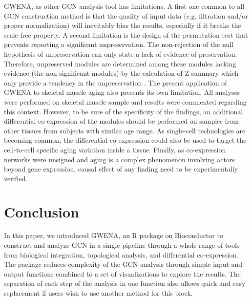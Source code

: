 GWENA, as other GCN analysis tool has limitations. A first one common to all GCN construction method is that the quality of input data (e.g. filtration and/or proper normalization) will inevitably bias the results, especially if it breaks the scale-free property. A second limitation is the design of the permutation test that prevents reporting a significant unpreservation. The non-rejection of the null hypothesis of unpreservation can only state a lack of evidence of preservation. Therefore, unpreserved modules are determined among these modules lacking evidence (the non-significant modules) by the calculation of Z summary which only provide a tendency in the unpreservation . The present application of GWENA to skeletal muscle aging also presents its own limitation. All analyses were performed on skeletal muscle sample and results were commented regarding this context. However, to be sure of the specificity of the findings, an additional differential co-expression of the modules should be performed on samples from other tissues from subjects with similar age range. As single-cell technologies are becoming common, the differential co-expression could also be used to target the cell-to-cell specific aging variation inside a tissue. Finally, as co-expression networks were unsigned and aging is a complex phenomenon involving actors beyond gene expression, causal effect of any finding need to be experimentally verified. 





\section{Conclusion}

In this paper, we introduced GWENA, an R package on Bioconductor to construct and analyze GCN in a single pipeline through a whole range of tools from biological integration, topological analysis, and differential co-expression. The package reduces complexity of the GCN analysis through simple input and output functions combined to a set of visualizations to explore the results. The separation of each step of the analysis in one function also allows quick and easy replacement if users wish to use another method for this block.

